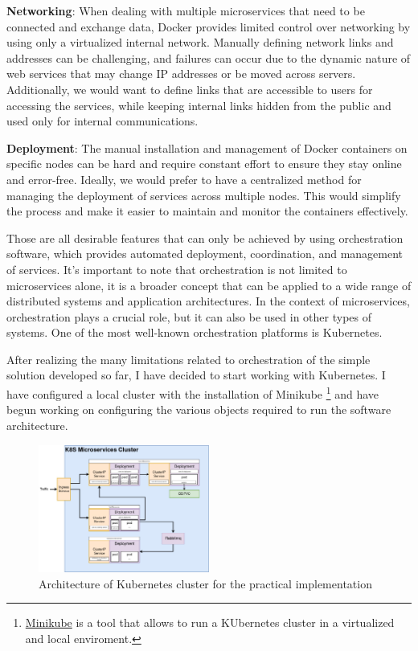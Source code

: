 \documentclass[manuscript,screen,review]{acmart}
\begin{document}
\textbf{Networking}: When dealing with multiple microservices that need to be connected and exchange data, Docker provides limited control over networking by using only a virtualized internal network. Manually defining network links and addresses can be challenging, and failures can occur due to the dynamic nature of web services that may change IP addresses or be moved across servers. Additionally, we would want to define links that are accessible to users for accessing the services, while keeping internal links hidden from the public and used only for internal communications.

\textbf{Deployment}: The manual installation and management of Docker containers on specific nodes can be hard and require constant effort to ensure they stay online and error-free. Ideally, we would prefer to have a centralized method for managing the deployment of services across multiple nodes. This would simplify the process and make it easier to maintain and monitor the containers effectively.

Those are all desirable features that can only be achieved by using orchestration software, which provides automated deployment, coordination, and management of services. It's important to note that orchestration is not limited to microservices alone, it is a broader concept that can be applied to a wide range of distributed systems and application architectures. In the context of microservices, orchestration plays a crucial role, but it can also be used in other types of systems. One of the most well-known orchestration platforms is Kubernetes.

After realizing the many limitations related to orchestration of the simple solution developed so far, I have decided to start working with Kubernetes. I have configured a local cluster with the installation of Minikube \footnote{\href{https://minikube.sigs.k8s.io/docs/}{Minikube} is a tool that allows to run a KUbernetes cluster in a virtualized and local enviroment.} and have begun working on configuring the various objects required to run the software architecture.

\begin{figure}[h]
  \centering
  \includegraphics[width=0.5\textwidth]{Images/Cluster.jpg}
  \caption{Architecture of Kubernetes cluster for the practical implementation}
\end{figure}
\end{document}
